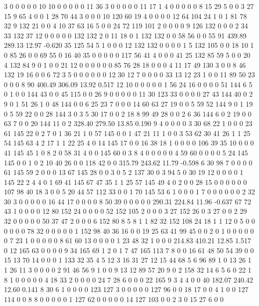  3 0 0 0 0 0 10 10 0 0 0 0 0 11 36 3 0 0 0 0
 0 11 17 1 4 0 0 0 0 0 8 15 29 5 0 0 3 27 15 9
 65 4 0 0 1 28 70 44 3 0 0 0 10 120 60 19 4 0 0 0
 0 12 64 104 24 1 0 1 81 78 32 9 132 21 0 0 4 10 37 63
 16 5 0 0 24 72 119 101 2 0 0 0 0 9 126 132 0 0 0 2
 34 33 132 37 12 0 0 0 0 0 132 132 2 0 11 18 0 1 132 132
 0 0 58 56 0 0 55 91
439.89 289.13 12.97 -0.620
 35 125 54 5 1 0 0 0 12 132 132 0 0 0 0 1 5 132 105 0
 0 18 10 1 0 85 26 0 0 69 55 0 16 40 35 0 0 0 0 0
 117 56 41 4 0 0 0 41 25 132 85 59 5 0 0 20 4 132 84 9
 0 1 0 0 21 12 0 0 0 0 0 0 85 76 28 18 0 0 0 4
 11 17 49 130 3 0 0 8 46 132 19 16 0 0 6 72 3 5 0 0
 0 0 0 0 12 30 12 7 0 0 0 0 33 13 12 23 1 0 0 11
 89 50 23 0 0 0 8 90
400.49 306.09 13.92 0.517
 12 10 0 0 0 0 0 1 56 24 16 0 0 0 0 51 144 6 5 0
 1 0 0 144 43 0 0 45 115 0 0 26 9 0 0 0 0 0 11 30
 123 33 0 0 0 0 27 43 144 40 0 2 9 0 1 51 26 1 0 48
 144 0 0 6 25 23 7 0 0 0 14 60 63 27 19 0 0 5 59 52
 144 9 0 1 19 0 5 59 22 0 0 28 144 3 0 3 5 30 17 0
 0 2 18 8 99 49 28 0 0 2 6 36 144 6 0 2 19 0 0 63
 7 0 0 20 144 11 0 2
328.40 279.50 13.85 0.190
 9 4 0 0 0 0 3 30 68 22 1 0 0 0 23 61 145 22 0 2
 7 0 1 36 21 1 0 57 145 0 0 1 47 21 11 1 0 0 3 53
 62 30 41 26 1 1 25 54 145 63 4 2 17 1 1 22 25 4 0 14
 145 17 0 0 16 38 18 1 0 0 0 0 106 39 35 10 0 0 0 41
 145 45 1 0 8 2 0 58 31 4 0 0 145 60 0 3 8 4 0 0
 0 0 0 4 59 60 0 0 0 0 5 24 145 145 0 0 1 0 2 10
 40 26 0 0 118 42 0 0
315.79 243.62 11.79 -0.598
 6 30 98 7 0 0 0 0 61 145 59 2 0 0 0 13 67 145 28 0
 0 3 0 5 2 137 30 0 3 94 5 0 30 19 12 0 0 0 0 1
 145 22 2 4 4 0 1 69 41 145 67 47 35 1 1 25 57 145 49 4
 0 2 0 0 28 15 0 0 0 0 0 0 107 98 40 18 3 0 0 5
 20 44 57 112 33 0 0 1 70 145 53 6 1 0 0 0 1 7 0 0
 0 0 0 0 2 32 30 3 0 0 0 0 0 16 44 17 0 0 0 0
 8 50 39 0 0 0 0 0
290.31 224.84 11.96 -0.637
 67 72 43 1 0 0 0 0 12 80 152 24 0 0 0 0 52 152 105 2
 0 0 0 3 27 152 26 0 3 27 0 0 2 29 32 0 0 0 0 0
 50 37 47 2 0 0 0 6 152 80 8 5 8 1 1 82 32 152 108 24
 18 1 1 12 0 5 0 0 0 0 0 0 78 32 0 0 0 0 0 1
 152 98 40 36 16 0 0 19 25 63 41 99 45 0 0 2 0 1 0 0
 0 0 0 0 7 23 1 0 0 0 0 0 8 61 60 13 0 0 0 0
 1 23 48 32 1 0 0 0
214.83 410.21 12.85 1.517
 0 12 165 63 0 0 0 0 9 34 165 69 1 2 0 1 7 47 165 113
 7 8 0 0 16 61 48 50 54 39 0 0 15 13 70 14 0 0 0 1
 133 32 35 4 5 12 3 16 31 27 12 15 44 68 5 6 96 89 1 0
 13 26 1 1 26 11 3 0 0 0 0 2 91 46 56 9 1 0 0 9
 13 12 89 57 20 9 0 2 158 32 14 6 5 6 0 22 1 8 1 0
 0 0 0 0 4 18 33 2 0 0 0 0 24 7 28 6 0 0 0 22
 165 9 3 4 4 0 0 40
182.07 240.42 12.60 0.141
 8 30 6 1 0 0 0 0 123 127 3 0 0 0 0 0 127 96 0 0
 18 17 0 0 4 1 0 0 127 114 0 0 8 8 0 0 0 0 0 1
 127 62 0 0 0 0 0 14 127 103 0 0 2 3 0 15 27 6 0 0
